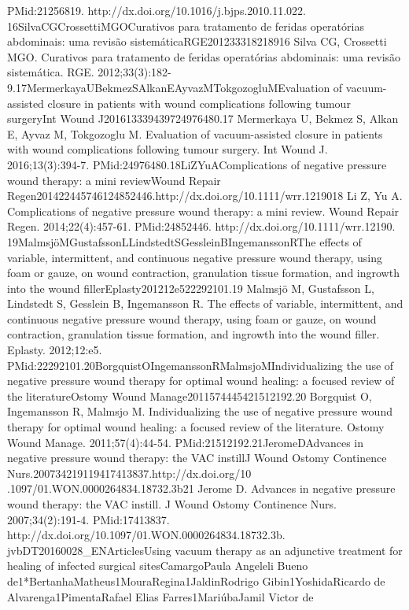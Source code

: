 \documentclass[numberinsection,times,10pt,spreadimages]{memoir}
\begin{document}
PMid:21256819. http://dx.doi.org/10.1016/j.bjps.2010.11.022.
16SilvaCGCrossettiMGOCurativos para tratamento de feridas operatórias
abdominais: uma
revisão sistemáticaRGE201233318218916 Silva CG, Crossetti MGO. Curativos para
tratamento de feridas
operatórias abdominais: uma revisão sistemática. RGE.
2012;33(3):182-9.17MermerkayaUBekmezSAlkanEAyvazMTokgozogluMEvaluation of
vacuum-assisted closure in patients with wound
complications following tumour surgeryInt Wound J201613339439724976480.17
Mermerkaya U, Bekmez S, Alkan E, Ayvaz M, Tokgozoglu M.
Evaluation of vacuum-assisted closure in patients with wound complications
following tumour surgery. Int Wound J. 2016;13(3):394-7.
PMid:24976480.18LiZYuAComplications of negative pressure wound therapy: a mini
reviewWound Repair
Regen201422445746124852446.http://dx.doi.org/10.1111/wrr.1219018 Li Z, Yu A.
Complications of negative pressure wound therapy: a
mini review. Wound Repair Regen. 2014;22(4):457-61. PMid:24852446.
http://dx.doi.org/10.1111/wrr.12190.
19MalmsjöMGustafssonLLindstedtSGessleinBIngemanssonRThe effects of variable,
intermittent, and continuous negative
pressure wound therapy, using foam or gauze, on wound contraction,
granulation tissue formation, and ingrowth into the wound
fillerEplasty201212e522292101.19 Malmsjö M, Gustafsson L, Lindstedt S, Gesslein
B, Ingemansson R.
The effects of variable, intermittent, and continuous negative pressure wound
therapy, using foam or gauze, on wound contraction, granulation tissue
formation, and ingrowth into the wound filler. Eplasty. 2012;12:e5.
PMid:22292101.20BorgquistOIngemanssonRMalmsjoMIndividualizing the use of
negative pressure wound therapy for
optimal wound healing: a focused review of the literatureOstomy Wound
Manage2011574445421512192.20 Borgquist O, Ingemansson R, Malmsjo M.
Individualizing the use of
negative pressure wound therapy for optimal wound healing: a focused review of
the literature. Ostomy Wound Manage. 2011;57(4):44-54.
PMid:21512192.21JeromeDAdvances in negative pressure wound therapy: the VAC
instillJ Wound Ostomy Continence Nurs.200734219119417413837.http://dx.doi.org/10
.1097/01.WON.0000264834.18732.3b21 Jerome D. Advances in negative pressure wound
therapy: the VAC
instill. J Wound Ostomy Continence Nurs. 2007;34(2):191-4. PMid:17413837.
http://dx.doi.org/10.1097/01.WON.0000264834.18732.3b.
jvbDT20160028\_{}ENArticlesUsing vacuum therapy as an adjunctive treatment for
healing of
infected surgical sitesCamargoPaula Angeleli Bueno
de1*BertanhaMatheus1MouraRegina1JaldinRodrigo Gibin1YoshidaRicardo de
Alvarenga1PimentaRafael Elias Farres1MariúbaJamil Victor de
\end{document}
